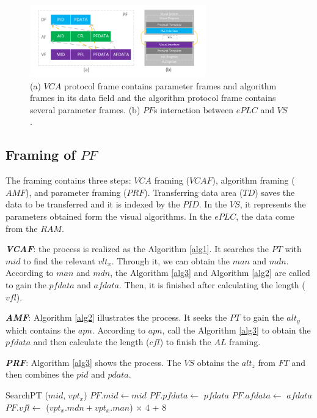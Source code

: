 \documentclass[journal,UTF8]{IEEEtran}
\begin{document}
\begin{figure}
	\centering
	\includegraphics[width=3in]{fig/Protocol.pdf}
	\caption{ (a) $VCA$ protocol frame contains parameter frames and algorithm frames in its data field and the algorithm protocol frame contains several parameter frames. (b) $PF$s interaction between $ePLC$ and $VS$.}
	\label{fig:Protocol}
\end{figure}
\subsection{Framing of $PF$}
The framing contains three steps: $VCA$ framing ($VCAF$), algorithm framing ($AMF$), and parameter framing ($PRF$). Transferring data area ($TD$) saves the data to be transferred and it is indexed by the $PID$. In the $VS$, it represents the parameters obtained form the visual algorithms. In the $ePLC$, the data come from the $RAM$.   


\textbf{\emph{VCAF}}: the process is realized as the Algorithm \ref{alg1}. It searches the $PT$ with $mid$ to find the relevant $vlt_x$. Through it, we can obtain the $man$ and $mdn$. According to $man$ and $mdn$, the Algorithm \ref{alg3} and Algorithm \ref{alg2} are called to gain the $pfdata$ and $afdata$. Then, it is finished after calculating the length ($vfl$).

\textbf{\emph{AMF}}: Algorithm \ref{alg2} illustrates the process. It seeks the $PT$ to gain the $alt_y$ which contains the $apn$. According to $apn$, call the Algorithm \ref{alg3} to obtain the $pfdata$ and then calculate the length ($cfl$) to finish the $AL$ framing.  

\textbf{\emph{PRF}}: Algorithm \ref{alg3} shows the process. The $VS$ obtains the $alt_z$ from $FT$ and then combines the $pid$ and $pdata$.


\begin{algorithm}
	\label{alg1}
	\caption{$VCAF$}%
	SearchPT ($mid$, $vpt_x$)\;
	$PF.mid\leftarrow mid$\; 
    $PF.pfdata\leftarrow$ $pfdata$\; 
    $PF.afdata\leftarrow$ $afdata$\; 
	$PF.vfl\leftarrow$ ($vpt_x.mdn+vpt_x.man$) $\times$ 4 + 8\;
\end{algorithm}
\end{document}
